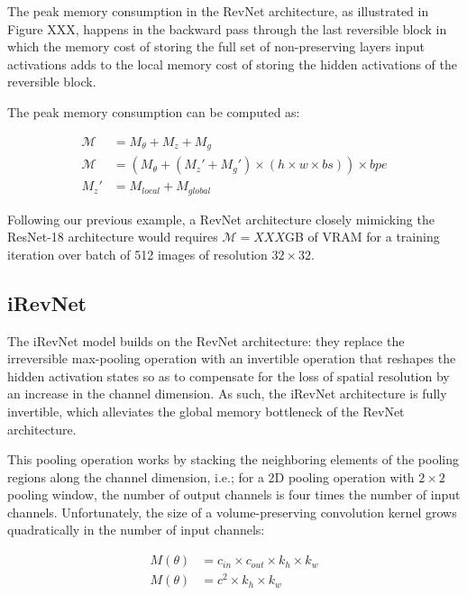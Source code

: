 \documentclass[twocolumn]{bmcart}
\begin{document}
The peak memory consumption in the RevNet architecture, as illustrated in Figure XXX, happens in the backward pass through the last reversible block in which the memory cost of storing the full set of non-preserving layers input activations adds to the local memory cost of storing the hidden activations of the reversible block.

The peak memory consumption can be computed as:

\begin{subequations}
\begin{align}
\mathcal{M} &= M_{\theta} + M_{z} + M_{g} \\
\mathcal{M} &= (M_{\theta} + (M_z' + M_{g}') \times (h \times w \times bs)) \times bpe \\
M_z' &= M_{local} + M_{global}
\end{align}
\end{subequations}

Following our previous example, a RevNet architecture closely mimicking the ResNet-18 architecture
would requires $\mathcal{M}=XXX$GB of VRAM for a training iteration over batch of 512 images of resolution $32 \times 32$.

\subsection{iRevNet}

The iRevNet model builds on the RevNet architecture: they replace the irreversible max-pooling operation with an invertible operation that reshapes the hidden activation states
so as to compensate for the loss of spatial resolution by an increase in the channel dimension. 
As such, the iRevNet architecture is fully invertible, which alleviates the global memory bottleneck of the RevNet architecture.

This pooling operation works by stacking the neighboring elements of the pooling regions along the channel dimension, 
i.e.; for a 2D pooling operation with $2 \times 2$ pooling window, the number of output channels is four times the number of input channels. 
Unfortunately, the size of a volume-preserving convolution kernel grows quadratically in the number of input channels:

\begin{subequations}
\begin{align}
M(\theta) &= c_{in} \times c_{out} \times k_h \times k_w \\
M(\theta) &= c^2 \times k_h \times k_w
\end{align}
\end{subequations}
\end{document}

